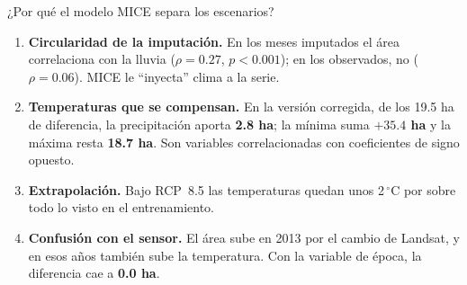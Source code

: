 \documentclass[10pt]{beamer}
\newcommand{\dato}[1]{\textbf{\color{blue!60!black}#1}}
\begin{document}
\begin{frame}{¿Por qué el modelo MICE separa los escenarios?}
\begin{enumerate}
\item \textbf{Circularidad de la imputación.} En los meses imputados el área correlaciona con la lluvia ($\rho=0.27$, $p<0.001$); en los observados, no ($\rho=0.06$). MICE le ``inyecta'' clima a la serie.
\item \textbf{Temperaturas que se compensan.} En la versión corregida, de los 19.5 ha de diferencia, la precipitación aporta \dato{2.8 ha}; la mínima suma \dato{$+35.4$ ha} y la máxima resta \dato{18.7 ha}. Son variables correlacionadas con coeficientes de signo opuesto.
\item \textbf{Extrapolación.} Bajo RCP~8.5 las temperaturas quedan unos 2\,$^\circ$C por sobre todo lo visto en el entrenamiento.
\item \textbf{Confusión con el sensor.} El área sube en 2013 por el cambio de Landsat, y en esos años también sube la temperatura. Con la variable de época, la diferencia cae a \dato{0.0 ha}.
\end{enumerate}
\vspace{2mm}
\centering
{}
\end{frame}
\end{document}
